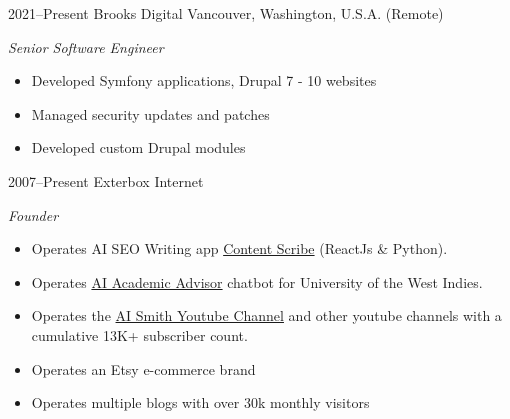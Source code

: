 \documentclass[]{friggeri-cv} %
\begin{document}
\begin{entrylist}

\entry
{2021--Present}
{Brooks Digital}
{Vancouver, Washington, U.S.A. (Remote)}
{\emph{Senior Software Engineer}
\begin{itemize}
\item Developed Symfony applications, Drupal 7 - 10 websites
\item Managed security updates and patches
\item Developed custom Drupal modules
\end{itemize}}

\entry
{2007--Present}
{Exterbox}
{Internet}
{\emph{Founder}
\begin{itemize}
\item Operates AI SEO Writing app \href{https://contentscibe.aismith.cc}{Content Scribe} (ReactJs \& Python).
\item Operates \href{https://uwi.edu/academic-advisor.php}{AI Academic Advisor} chatbot for University of the West Indies.
\item Operates the \href{https://www.youtube.com/@AISmithOfficial}{ AI Smith Youtube Channel} and other youtube channels with a cumulative 13K+ subscriber count.
\item Operates an Etsy e-commerce brand
\item Operates multiple blogs with over 30k monthly visitors
\end{itemize}}



\end{entrylist}
\end{document}

